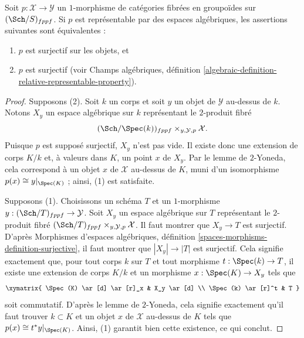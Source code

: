 \begin{lemma}
\label{lemma-representable-by-spaces-surjective}
Soit $p : \mathcal{X} \to \mathcal{Y}$ un $1$-morphisme de catégories
fibrées en groupoïdes sur $(\Sch/S)_{fppf}$. Si $p$ est
représentable par des espaces algébriques, les assertions suivantes sont équivalentes :
\begin{enumerate}
\item $p$ est surjectif sur les objets, et
\item $p$ est surjectif (voir
Champs algébriques,
définition \ref{algebraic-definition-relative-representable-property}).
\end{enumerate}
\end{lemma}

\begin{proof}
Supposons (2). Soit $k$ un corps et soit $y$ un objet de
$\mathcal{Y}$ au-dessus de $k$. Notons $X_y$ un espace algébrique sur $k$
représentant le $2$-produit fibré
$$
(\Sch/\Spec(k))_{fppf} \times_{y, \mathcal{Y}, p} \mathcal{X}.
$$
Puisque $p$ est supposé surjectif, $X_y$ n'est pas vide.
Il existe donc une extension de corps $K/k$ et, à valeurs dans $K$, un point
$x$ de $X_y$. Par le lemme de $2$-Yoneda, cela correspond à un objet
$x$ de $\mathcal{X}$ au-dessus de $K$, muni d'un isomorphisme
$p(x) \cong y|_{\Spec(K)}$ ; ainsi, (1) est satisfaite.

\medskip\noindent
Supposons (1). Choisissons un schéma $T$ et un $1$-morphisme
$y : (\Sch/T)_{fppf} \to \mathcal{Y}$. Soit
$X_y$ un espace algébrique sur $T$ représentant le $2$-produit fibré
$(\Sch/T)_{fppf} \times_{y, \mathcal{Y}, p} \mathcal{X}$.
Il faut montrer que $X_y \to T$ est surjectif. D'après
Morphismes d'espaces algébriques, définition \ref{spaces-morphisms-definition-surjective},
il faut montrer que $|X_y| \to |T|$ est surjectif.
Cela signifie exactement que, pour tout corps $k$ sur $T$ et tout
morphisme $t : \Spec(k) \to T$, il existe une extension de corps
$K/k$ et un morphisme $x : \Spec(K) \to X_y$ tels que
$$
\xymatrix{
\Spec(K) \ar[d] \ar[r]_x & X_y \ar[d] \\
\Spec(k) \ar[r]^t & T
}
$$
soit commutatif. D'après le lemme de $2$-Yoneda, cela signifie exactement qu'il faut trouver
$k \subset K$ et un objet $x$ de $\mathcal{X}$ au-dessus de $K$ tels que
$p(x) \cong t^*y|_{\Spec(K)}$. Ainsi, (1) garantit bien cette
existence, ce qui conclut.
\end{proof}












